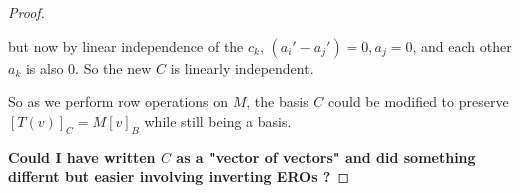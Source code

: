 \documentclass[12pt]{article} %
\begin{document}
\begin{flushleft}
\begin{proof}
\begin{itemize}
  but now by linear independence of the $c_k$, $(a_i'-a_j')=0, a_j = 0$, and each other $a_k$ is also $0$. So the new $C$ is linearly independent.

  So as we perform row operations on $M$, the basis $C$ could be modified to preserve $[T(v)]_C = M[v]_B$ while still being a basis.
  \end{itemize}

  \textbf{Could I have written $C$ as a "vector of vectors" and did something differnt but easier involving inverting EROs ?}
\end{proof}
 
\end{flushleft}
\end{document}
